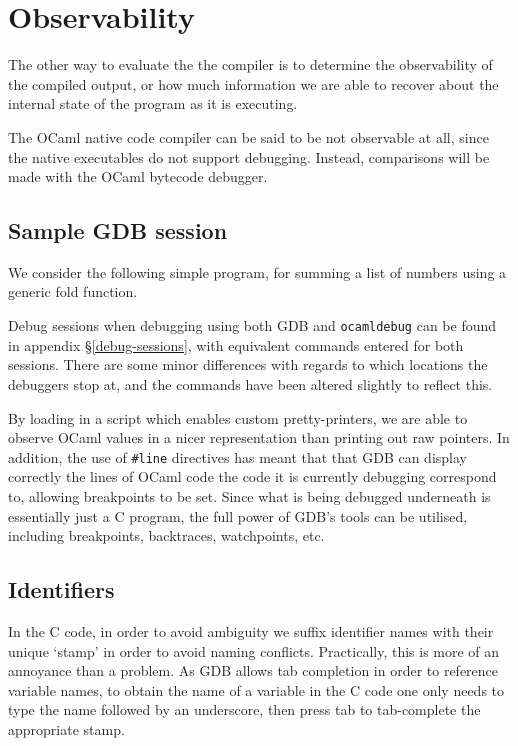\documentclass[12pt,a4paper,twoside,openright]{report}
\begin{document}
\section{Observability}

The other way to evaluate the the compiler is to determine the observability of 
the compiled output, or how much information we are able to recover about the 
internal state of the program as it is executing.

The OCaml native code compiler can be said to be not observable at all, since 
the native executables do not support debugging. Instead, comparisons will be 
made with the OCaml bytecode debugger.

\subsection{Sample GDB session}

We consider the following simple program, for summing a list of numbers using a 
generic fold function.



Debug sessions when debugging using both GDB and \texttt{ocamldebug} can be
found in appendix \S\ref{debug-sessions}, with equivalent commands entered
for both sessions. There are some minor differences with regards to which
locations the debuggers stop at, and the commands have been altered slightly to
reflect this.

By loading in a script which enables custom pretty-printers, we are able to 
observe OCaml values in a nicer representation than printing out raw pointers. 
In addition, the use of \texttt{\#}\texttt{line} directives has meant that that 
GDB can display correctly the lines of OCaml code the code it is currently 
debugging correspond to, allowing breakpoints to be set. Since what is being 
debugged underneath is essentially just a C program, the full power of GDB's 
tools can be utilised, including breakpoints, backtraces, watchpoints, etc.

\subsection{Identifiers}

In the C code, in order to avoid ambiguity we suffix identifier names with 
their unique `stamp' in order to avoid naming conflicts. Practically, this is 
more of an annoyance than a problem. As GDB allows tab completion in order to 
reference variable names, to obtain the name of a variable in the C code one 
only needs to type the name followed by an underscore, then press tab to 
tab-complete the appropriate stamp.
\end{document}
